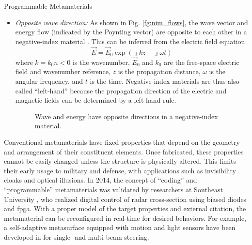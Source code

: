 \begin{section}{}
\begin{subsection}{Programmable Metamaterials}
\begin{itemize}
\begin{figure}[H]
			\end{figure}
			\item \emph{Opposite wave direction:} As shown in Fig. \ref{fg:nim_flows}, the wave vector and energy flow (indicated by the Poynting vector) are opposite to each other in a negative-index material \cite{Pendry2004}. This can be inferred from the electric field equation
			\begin{equation}
				\vec{E} = \vec{E}_0 \exp(\jmath k z - \jmath \omega t)
			\end{equation}
			where $k = k_0 n < 0$ is the wavenumber, $\vec{E}_0$ and $k_0$ are the free-space electric field and wavenumber reference, $z$ is the propagation distance, $\omega$ is the angular frequency, and $t$ is the time.
			Negative-index materials are thus also called ``left-hand'' because the propagation direction of the electric and magnetic fields can be determined by a left-hand rule.
			\begin{figure}[H]
				\centering
				\caption{Wave and energy have opposite directions in a negative-index material.}
			\end{figure}
		\end{itemize}

		Conventional metamaterials have fixed properties that depend on the geometry and arrangement of their constituent elements.
		Once fabricated, these properties cannot be easily changed unless the structure is physically altered.
		This limits their early usage to military and defense, with applications such as invisibility cloaks and optical illusions.
		In 2014, the concept of ``coding'' and ``programmable'' metamaterials was validated by researchers at Southeast University \cite{Cui2014}, who realized digital control of radar cross-section using biased diodes and \gls{fpga}.
		With a proper model of the target properties and external citation, the metamaterial can be reconfigured in real-time for desired behaviors.
		For example, a self-adaptive metasurface equipped with motion and light sensors have been developed in \cite{Ma2019} for single- and multi-beam steering.


\end{subsection}
\end{section}
